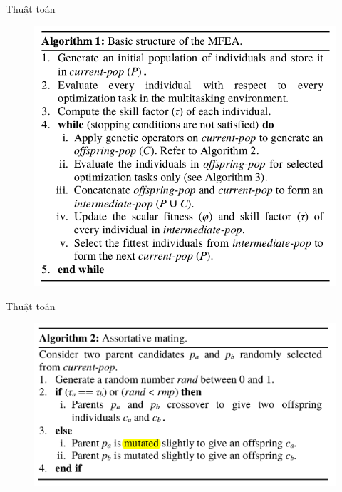 \documentclass[compress]{beamer}
\begin{document}
\begin{frame}{Thuật toán}
\begin{figure}
\includegraphics[scale=0.45]{al1.png}
\end{figure}
\end{frame}

\begin{frame}{Thuật toán}
\begin{figure}
\includegraphics[scale=0.45]{al2.png}
\end{figure}
\end{frame}
\end{document}
